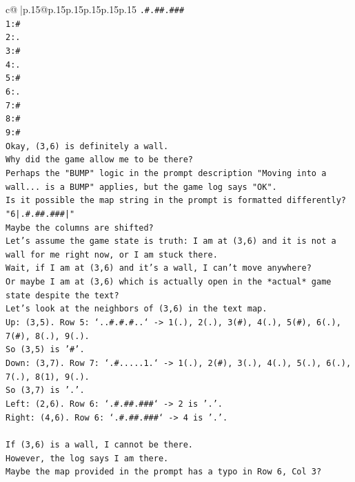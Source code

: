 \documentclass{article}
\begin{document}
{\begin{supertabular}{c@{$\;$}|p{.15\linewidth}@{}p{.15\linewidth}p{.15\linewidth}p{.15\linewidth}p{.15\linewidth}p{.15\linewidth}}
{{{\texttt{.\#.\#\#.\#\#\#} \\
\texttt{1:\#} \\
\texttt{2:.} \\
\texttt{3:\#} \\
\texttt{4:.} \\
\texttt{5:\#} \\
\texttt{6:.} \\
\texttt{7:\#} \\
\texttt{8:\#} \\
\texttt{9:\#} \\
\texttt{Okay, (3,6) is definitely a wall.} \\
\texttt{Why did the game allow me to be there?} \\
\texttt{Perhaps the "BUMP" logic in the prompt description "Moving into a wall... is a BUMP" applies, but the game log says "OK".} \\
\texttt{Is it possible the map string in the prompt is formatted differently?} \\
\texttt{"6|.\#.\#\#.\#\#\#|"} \\
\texttt{Maybe the columns are shifted?} \\
\texttt{Let's assume the game state is truth: I am at (3,6) and it is not a wall for me right now, or I am stuck there.} \\
\texttt{Wait, if I am at (3,6) and it's a wall, I can't move anywhere?} \\
\texttt{Or maybe I am at (3,6) which is actually open in the *actual* game state despite the text?} \\
\texttt{Let's look at the neighbors of (3,6) in the text map.} \\
\texttt{Up: (3,5). Row 5: `..\#.\#.\#..` {-}> 1(.), 2(.), 3(\#), 4(.), 5(\#), 6(.), 7(\#), 8(.), 9(.).} \\
\texttt{So (3,5) is '\#'.} \\
\texttt{Down: (3,7). Row 7: `.\#.....1.` {-}> 1(.), 2(\#), 3(.), 4(.), 5(.), 6(.), 7(.), 8(1), 9(.).} \\
\texttt{So (3,7) is '.'.} \\
\texttt{Left: (2,6). Row 6: `.\#.\#\#.\#\#\#` {-}> 2 is '.'.} \\
\texttt{Right: (4,6). Row 6: `.\#.\#\#.\#\#\#` {-}> 4 is '.'.} \\
\\ 
\texttt{If (3,6) is a wall, I cannot be there.} \\
\texttt{However, the log says I am there.} \\
\texttt{Maybe the map provided in the prompt has a typo in Row 6, Col 3?} \\
}}}
\end{supertabular}}
\end{document}
